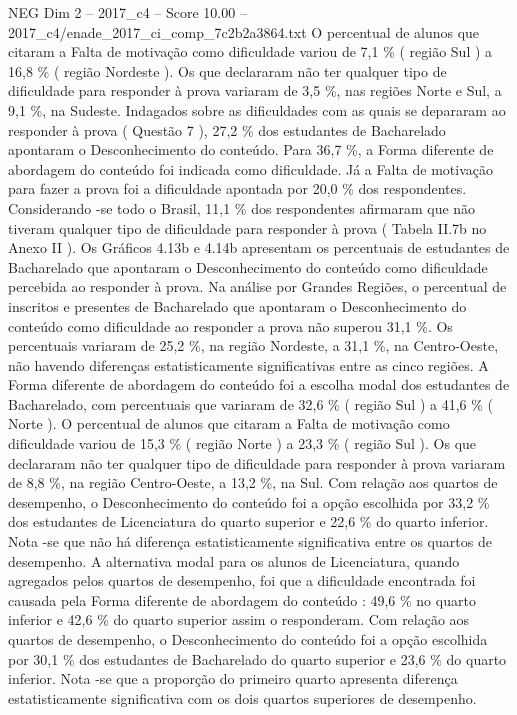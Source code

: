 \begin{textsample}{NEG Dim 2 – 2017\_c4 – Score 10.00 – 2017\_c4/enade\_2017\_ci\_comp\_7c2b2a3864.txt}
O percentual de alunos que citaram a Falta de motivação como dificuldade variou de 7,1 \% ( região Sul ) a 16,8 \% ( região Nordeste ).
Os que declararam não ter qualquer tipo de dificuldade para responder à prova variaram de 3,5 \%, nas regiões Norte e Sul, a 9,1 \%, na Sudeste.
Indagados sobre as dificuldades com as quais se depararam ao responder à prova ( Questão 7 ), 27,2 \% dos estudantes de Bacharelado apontaram o Desconhecimento do conteúdo.
Para 36,7 \%, a Forma diferente de abordagem do conteúdo foi indicada como dificuldade.
Já a Falta de motivação para fazer a prova foi a dificuldade apontada por 20,0 \% dos respondentes.
Considerando -se todo o Brasil, 11,1 \% dos respondentes afirmaram que não tiveram qualquer tipo de dificuldade para responder à prova ( Tabela II.7b no Anexo II ).
Os Gráficos 4.13b e 4.14b apresentam os percentuais de estudantes de Bacharelado que apontaram o Desconhecimento do conteúdo como dificuldade percebida ao responder à prova.
Na análise por Grandes Regiões, o percentual de inscritos e presentes de Bacharelado que apontaram o Desconhecimento do conteúdo como dificuldade ao responder a prova não superou 31,1 \%.
Os percentuais variaram de 25,2 \%, na região Nordeste, a 31,1 \%, na Centro-Oeste, não havendo diferenças estatisticamente significativas entre as cinco regiões.
A Forma diferente de abordagem do conteúdo foi a escolha modal dos estudantes de Bacharelado, com percentuais que variaram de 32,6 \% ( região Sul ) a 41,6 \% ( Norte ).
O percentual de alunos que citaram a Falta de motivação como dificuldade variou de 15,3 \% ( região Norte ) a 23,3 \% ( região Sul ).
Os que declararam não ter qualquer tipo de dificuldade para responder à prova variaram de 8,8 \%, na região Centro-Oeste, a 13,2 \%, na Sul.
Com relação aos quartos de desempenho, o Desconhecimento do conteúdo foi a opção escolhida por 33,2 \% dos estudantes de Licenciatura do quarto superior e 22,6 \% do quarto inferior.
Nota -se que não há diferença estatisticamente significativa entre os quartos de desempenho.
A alternativa modal para os alunos de Licenciatura, quando agregados pelos quartos de desempenho, foi que a dificuldade encontrada foi causada pela Forma diferente de abordagem do conteúdo : 49,6 \% no quarto inferior e 42,6 \% do quarto superior assim o responderam.
Com relação aos quartos de desempenho, o Desconhecimento do conteúdo foi a opção escolhida por 30,1 \% dos estudantes de Bacharelado do quarto superior e 23,6 \% do quarto inferior.
Nota -se que a proporção do primeiro quarto apresenta diferença estatisticamente significativa com os dois quartos superiores de desempenho.

\end{textsample}
